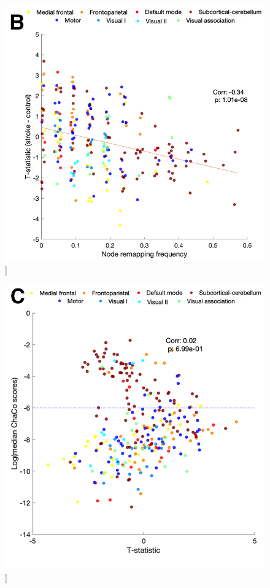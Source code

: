 \documentclass[phd,tocprelim]{cornell}
\renewcommand{\caption}[1]{\singlespacing\hangcaption{#1}\normalspacing}
\begin{document}
\begin{figure}[h!]
		\ContinuedFloat
		\captionsetup{labelformat=adja-page}
    \centering
    \includegraphics[width=\textwidth]{chapter1/SupplementaryFigure11B.png}
    \caption[]{}
\end{figure}
\null
\vfill
\clearpage
\null
\vfill
\begin{figure}[h!]
		\ContinuedFloat
		\captionsetup{labelformat=adja-page}
    \centering
    \includegraphics[width=\textwidth]{chapter1/SupplementaryFigure11C.png}
    \caption[]{}
\end{figure}
\end{document}
